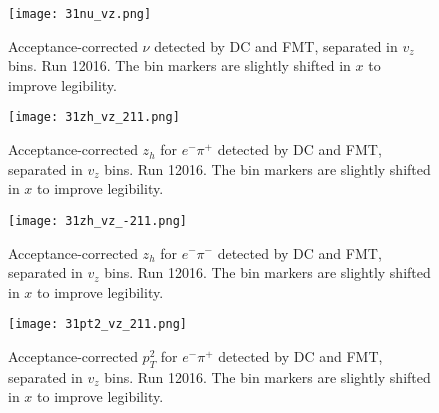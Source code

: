     \begin{figure}
        \centering
        \texttt{[image: 31nu\_vz.png]}
        \caption[Acceptance-corrected $\nu$ separated in $v_z$ bins]
        {Acceptance-corrected $\nu$ detected by DC and FMT, separated in $v_z$ bins.
        Run 12016.
        The bin markers are slightly shifted in $x$ to improve legibility.}
        \label{fig::14.31::nu_vz}
    \end{figure}

    \begin{figure}
        \centering
        \texttt{[image: 31zh\_vz\_211.png]}
        \caption[Acceptance-corrected $z_h$ for $e^-\pi^+$ separated in $v_z$ bins]
        {Acceptance-corrected $z_h$ for $e^-\pi^+$ detected by DC and FMT, separated in $v_z$ bins.
        Run 12016.
        The bin markers are slightly shifted in $x$ to improve legibility.}
        \label{fig::14.31::zh_211_vz}
    \end{figure}

    \begin{figure}
        \centering
        \texttt{[image: 31zh\_vz\_-211.png]}
        \caption[Acceptance-corrected $z_h$ for $e^-\pi^-$ separated in $v_z$ bins]
        {Acceptance-corrected $z_h$ for $e^-\pi^-$ detected by DC and FMT, separated in $v_z$ bins.
        Run 12016.
        The bin markers are slightly shifted in $x$ to improve legibility.}
        \label{fig::14.31::zh_-211_vz}
    \end{figure}

    \begin{figure}
        \centering
        \texttt{[image: 31pt2\_vz\_211.png]}
        \caption[Acceptance-corrected $p_T^2$ for $e^-\pi^+$ separated in $v_z$ bins]
        {Acceptance-corrected $p_T^2$ for $e^-\pi^+$ detected by DC and FMT, separated in $v_z$ bins.
        Run 12016.
        The bin markers are slightly shifted in $x$ to improve legibility.}
        \label{fig::14.31::pt2_211_vz}
    \end{figure}


